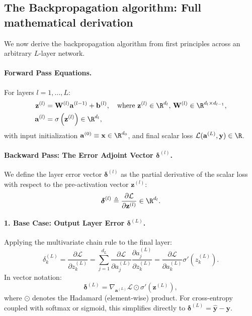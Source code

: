 \subsection{The Backpropagation algorithm: Full mathematical derivation}
\label{sec:backpropagation_derivation}

We now derive the backpropagation algorithm from first principles across an arbitrary $L$-layer network.

\paragraph{Forward Pass Equations.}
For layers $l = 1, \dots, L$:
\begin{align}
\mathbf{z}^{(l)} &= \mathbf{W}^{(l)} \mathbf{a}^{(l-1)} + \mathbf{b}^{(l)}, \quad \text{where } \mathbf{z}^{(l)} \in \R^{d_l}, \, \mathbf{W}^{(l)} \in \R^{d_l \times d_{l-1}}, \label{eq:forward_z} \\
\mathbf{a}^{(l)} &= \sigma\left( \mathbf{z}^{(l)} \right) \in \R^{d_l}, \label{eq:forward_a}
\end{align}
with input initialization $\mathbf{a}^{(0)} \equiv \mathbf{x} \in \R^{d_0}$, and final scalar loss $\mathcal{L}(\mathbf{a}^{(L)}, \mathbf{y}) \in \R$.

\paragraph{Backward Pass: The Error Adjoint Vector $\boldsymbol{\delta}^{(l)}$.}
We define the layer error vector $\boldsymbol{\delta}^{(l)}$ as the partial derivative of the scalar loss with respect to the pre-activation vector $\mathbf{z}^{(l)}$:
\begin{equation}
\boldsymbol{\delta}^{(l)} \triangleq \frac{\partial \mathcal{L}}{\partial \mathbf{z}^{(l)}} \in \R^{d_l}.
\label{eq:delta_definition}
\end{equation}

\paragraph{1. Base Case: Output Layer Error $\boldsymbol{\delta}^{(L)}$.}
Applying the multivariate chain rule to the final layer:
\begin{equation}
\delta_k^{(L)} = \frac{\partial \mathcal{L}}{\partial z_k^{(L)}} = \sum_{j=1}^{d_L} \frac{\partial \mathcal{L}}{\partial a_j^{(L)}} \frac{\partial a_j^{(L)}}{\partial z_k^{(L)}} = \frac{\partial \mathcal{L}}{\partial a_k^{(L)}} \sigma'\left( z_k^{(L)} \right).
\end{equation}
In vector notation:
\begin{equation}
\boldsymbol{\delta}^{(L)} = \nabla_{\mathbf{a}^{(L)}} \mathcal{L} \odot \sigma'\left( \mathbf{z}^{(L)} \right),
\label{eq:delta_output_layer}
\end{equation}
where $\odot$ denotes the Hadamard (element-wise) product. For cross-entropy coupled with softmax or sigmoid, this simplifies directly to $\boldsymbol{\delta}^{(L)} = \hat{\mathbf{y}} - \mathbf{y}$.

